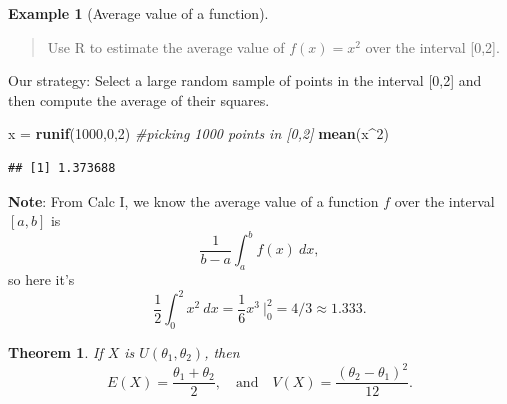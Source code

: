 \documentclass[
]{book}
\newenvironment{Shaded}{\begin{snugshade}}{\end{snugshade}}
\newcommand{\CommentTok}[1]{\textcolor[rgb]{0.56,0.35,0.01}{\textit{#1}}}
\newcommand{\DecValTok}[1]{\textcolor[rgb]{0.00,0.00,0.81}{#1}}
\newcommand{\FunctionTok}[1]{\textcolor[rgb]{0.13,0.29,0.53}{\textbf{#1}}}
\newcommand{\NormalTok}[1]{#1}
\newcommand{\OtherTok}[1]{\textcolor[rgb]{0.56,0.35,0.01}{#1}}
\newcommand{\SpecialCharTok}[1]{\textcolor[rgb]{0.81,0.36,0.00}{\textbf{#1}}}
\newtheorem{theorem}{Theorem}[chapter]
\theoremstyle{definition}
\theoremstyle{definition}
\newtheorem{example}{Example}[chapter]
\theoremstyle{definition}
\theoremstyle{definition}
\theoremstyle{remark}
\begin{document}
\begin{example}[Average value of a function]
\leavevmode

\begin{quote}
Use R to estimate the average value of \(f(x) = x^2\) over the interval {[}0,2{]}.
\end{quote}

Our strategy: Select a large random sample of points in the interval {[}0,2{]} and then compute the average of their squares.

\begin{Shaded}
\begin{Highlighting}[]
\NormalTok{x }\OtherTok{=} \FunctionTok{runif}\NormalTok{(}\DecValTok{1000}\NormalTok{,}\DecValTok{0}\NormalTok{,}\DecValTok{2}\NormalTok{) }\CommentTok{\#picking 1000 points in [0,2]}
\FunctionTok{mean}\NormalTok{(x}\SpecialCharTok{\^{}}\DecValTok{2}\NormalTok{)}
\end{Highlighting}
\end{Shaded}

\begin{verbatim}
## [1] 1.373688
\end{verbatim}

\textbf{Note}: From Calc I, we know the average value of a function \(f\) over the interval \([a,b]\) is \[\frac{1}{b-a} \int_a^b f(x)~dx,\]
so here it's \[\frac{1}{2}\int_0^2 x^2~dx = \frac{1}{6} x^3 ~\biggr|_0^2 = 4/3 \approx 1.333.\]

\end{example}

\begin{theorem}
\protect\hypertarget{thm:uniform-EandV}{}\label{thm:uniform-EandV}If \(X\) is \(U(\theta_1,\theta_2)\), then \[E(X) = \frac{\theta_1 + \theta_2}{2}, ~~~ \text{ and } ~~~ V(X) = \frac{(\theta_2-\theta_1)^2}{12}.\]
\end{theorem}
\end{document}
